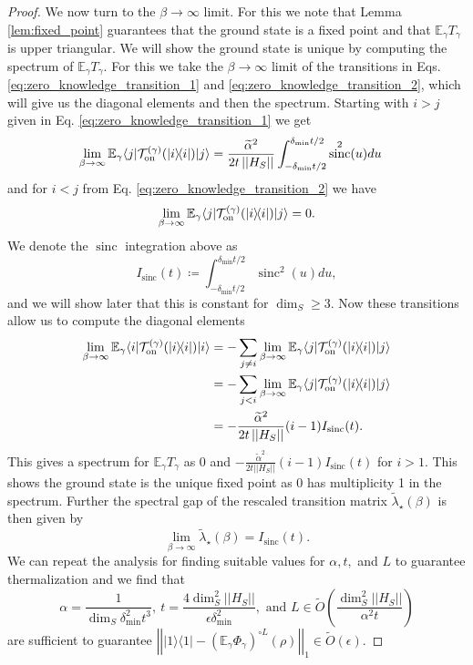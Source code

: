 \documentclass{article}
\newcommand{\on}{\rm on}
\newcommand{\ket}[1]{|#1\rangle}
\newcommand{\bra}[1]{\langle #1|}
\newcommand{\ketbra}[2]{| #1\rangle\! \langle #2|}
\newcommand{\norm}[1]{\left|\left| #1 \right|\right|}
\newcommand{\EE}{\mathbb{E}}
\newcommand{\TT}{\mathcal{T}}
\newcommand{\bigotilde}[1]{\widetilde{O} \left( #1 \right)}
\DeclareMathOperator{\sinc}{sinc}
\begin{document}
\begin{proof}
    We now turn to the $\beta \to \infty$ limit. For this we note that Lemma \ref{lem:fixed_point} guarantees that the ground state is a fixed point and that $\EE_\gamma T_\gamma$ is upper triangular. We will show the ground state is unique by computing the spectrum of $\EE_\gamma T_\gamma$. For this we take the $\beta \to \infty$ limit of the transitions in Eqs. \eqref{eq:zero_knowledge_transition_1} and \eqref{eq:zero_knowledge_transition_2}, which will give us the diagonal elements and then the spectrum. Starting with $i > j$ given in Eq. \eqref{eq:zero_knowledge_transition_1} we get
    \begin{align}
        \lim_{\beta \to \infty} \EE_\gamma \bra{j} \TT_{\on}^{(\gamma)}(\ketbra{i}{i})\ket{j} &= \frac{\widetilde{\alpha}^2}{2 t \norm{H_S}} \int_{-\delta_{\min}t/2}^{\delta_{\min}t/2} \sinc^2(u) du
    \end{align}
    and for $i < j$ from Eq. \eqref{eq:zero_knowledge_transition_2} we have
    \begin{equation}
        \lim_{\beta \to \infty} \EE_\gamma \bra{j} \TT_{\on}^{(\gamma)}(\ketbra{i}{i})\ket{j} = 0.
    \end{equation}
    We denote the $\sinc$ integration above as
    \begin{equation}
        I_{\sinc}(t) \coloneqq \int_{-\delta_{\min}t/2}^{\delta_{\min} t/2} \sinc^2(u) du,
    \end{equation}
    and we will show later that this is constant for $\dim_S \ge 3$. Now these transitions allow us to compute the diagonal elements
    \begin{align}
        \lim_{\beta \to \infty} \EE_\gamma \bra{i} \TT_{\on}^{(\gamma)}(\ketbra{i}{i}) \ket{i} &= - \sum_{j \neq i} \lim_{\beta \to \infty} \EE_\gamma \bra{j} \TT_{\on}^{(\gamma)}(\ketbra{i}{i}) \ket{j} \\
        &= - \sum_{j < i} \lim_{\beta \to \infty} \EE_\gamma \bra{j} \TT_{\on}^{(\gamma)}(\ketbra{i}{i}) \ket{j} \\
        &= - \frac{\widetilde{\alpha}^2}{2 t \norm{H_S}} (i - 1) I_{\sinc}(t).
    \end{align}
    This gives a spectrum for $\EE_\gamma T_\gamma$ as 0 and $- \frac{\widetilde{\alpha}^2}{2 t \norm{H_S}} (i - 1) I_{\sinc}(t)$ for $i > 1$. This shows the ground state is the unique fixed point as 0 has multiplicity 1 in the spectrum. Further the spectral gap of the rescaled transition matrix $\widetilde{\lambda}_\star(\beta)$ is then given by
    \begin{equation}
        \lim_{\beta \to \infty} \widetilde{\lambda}_\star(\beta) = I_{\sinc}(t).
    \end{equation}
    We can repeat the analysis for finding suitable values for $\alpha, t, $ and $L$ to guarantee thermalization and we find that 
    \begin{equation}
        \alpha = \frac{1}{\dim_S \delta_{\min}^2 t^3}, ~ t = \frac{4 \dim_S^2 \norm{H_S}}{\epsilon \delta_{\min}^2}, \text{ and } L \in \bigotilde{\frac{\dim_S^2 \norm{H_S}}{\alpha^2 t}}
    \end{equation}
    are sufficient to guarantee $\norm{\ketbra{1}{1} - \left( \EE_\gamma \Phi_\gamma\right)^{\circ L} (\rho)}_1 \in \bigotilde{\epsilon}$.


\end{proof}
\end{document}

